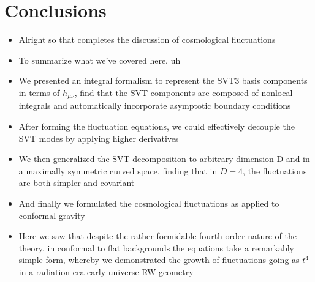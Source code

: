 \documentclass[10pt,letterpaper]{article}
\numberwithin{equation}{section}
\begin{document}
\section{Conclusions}
\begin{itemize}
	\item Alright so that completes the discussion of cosmological fluctuations
	\item To summarize what we've covered here, uh
	\item We presented an integral formalism to represent the SVT3 basis components in terms of $h_{\mu\nu}$, find that the SVT components are composed of nonlocal integrals and automatically incorporate asymptotic boundary conditions
	\item After forming the fluctuation equations, we could effectively decouple the SVT modes by applying higher derivatives
	\item We then generalized the SVT decomposition to arbitrary dimension D and in a maximally symmetric curved space, finding that in $D=4$, the fluctuations are both simpler and covariant
	\item And finally we formulated the cosmological fluctuations as applied to conformal gravity
	\item Here we saw that despite the rather formidable fourth order nature of the theory, in conformal to flat backgrounds the equations take a remarkably simple form, whereby we demonstrated the growth of fluctuations going as $t^4$ in a radiation era early universe RW geometry
\end{itemize}

\end{document}
